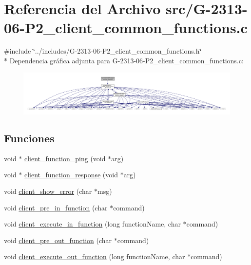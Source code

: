 \hypertarget{G-2313-06-P2__client__common__functions_8c}{}\section{Referencia del Archivo src/\+G-\/2313-\/06-\/\+P2\+\_\+client\+\_\+common\+\_\+functions.c}
\label{G-2313-06-P2__client__common__functions_8c}
{\ttfamily \#include \char`\"{}../includes/\+G-\/2313-\/06-\/\+P2\+\_\+client\+\_\+common\+\_\+functions.\+h\char`\"{}}\\*
Dependencia gráfica adjunta para G-\/2313-\/06-\/\+P2\+\_\+client\+\_\+common\+\_\+functions.c\+:\nopagebreak
\begin{figure}[H]
\begin{center}
\leavevmode
\includegraphics[width=350pt]{G-2313-06-P2__client__common__functions_8c__incl}
\end{center}
\end{figure}
\subsection*{Funciones}
\begin{DoxyCompactItemize}
\item 
void $\ast$ \hyperlink{G-2313-06-P2__client__common__functions_8c_a7297f848d5b0bd4990857d03cf3111e4}{client\+\_\+function\+\_\+ping} (void $\ast$arg)
\item 
void $\ast$ \hyperlink{G-2313-06-P2__client__common__functions_8c_afbd2dc7b3224fc3d2c5c9233b307c376}{client\+\_\+function\+\_\+response} (void $\ast$arg)
\item 
void \hyperlink{G-2313-06-P2__client__common__functions_8c_a03942275c5a503be4f7288cda71fb139}{client\+\_\+show\+\_\+error} (char $\ast$msg)
\item 
void \hyperlink{G-2313-06-P2__client__common__functions_8c_aa74c686c447b275e6a8cf36419033e81}{client\+\_\+pre\+\_\+in\+\_\+function} (char $\ast$command)
\item 
void \hyperlink{G-2313-06-P2__client__common__functions_8c_a6dd72e0b56b87f85d8cac2a30066198b}{client\+\_\+execute\+\_\+in\+\_\+function} (long function\+Name, char $\ast$command)
\item 
void \hyperlink{G-2313-06-P2__client__common__functions_8c_a68019fe1e0edcc71bb3dadeb70a86dcd}{client\+\_\+pre\+\_\+out\+\_\+function} (char $\ast$command)
\item 
void \hyperlink{G-2313-06-P2__client__common__functions_8c_a26512d35b24fec46c8fa4c803dc00867}{client\+\_\+execute\+\_\+out\+\_\+function} (long function\+Name, char $\ast$command)
\end{DoxyCompactItemize}
